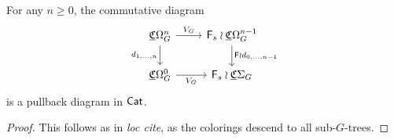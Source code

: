\documentclass[a4paper,10pt
,draft
]{article}%
\newcommand{\UC}{\underline{\mathfrak C}}
\renewcommand{\1}{\ensuremath{\mathbb{id}}}
\begin{document}
\begin{proposition}[{cf. \cite[Prop 3.82]{BP17}}]
      For any $n \geq 0$, the commutative diagram
      \begin{equation}
            \begin{tikzcd}
                  \UC\Omega_G^n \arrow[d, "d_{1,\dots,n}"'] \arrow[r, "V_G"]
                  &
                  \mathsf F_s \wr \UC\Omega_G^{n-1} \arrow[d, "\mathsf F \wr d_{0,\dots,n-1}"]
                  \\
                  \UC\Omega_G^0 \arrow[r, "V_G"']
                  &
                  \mathsf F_s \wr \UC\Sigma_G
            \end{tikzcd}
      \end{equation}
      is a pullback diagram in $\mathsf{Cat}$.
\end{proposition}
\begin{proof}
      This follows as in \textit{loc cite}, as the colorings descend to all sub-$G$-trees.
\end{proof}

\end{document}
